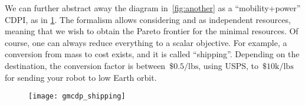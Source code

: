\begin{example}
    We can further abstract away the diagram in~\cref{fig:another} as a ``mobility+power'' CDPI, as in \cref{fig:shipping}.
    The formalism allows considering  and  as independent resources, meaning that we wish to obtain the Pareto frontier for the minimal resources.
    Of course, one can always reduce everything to a scalar objective.
    For example, a conversion from mass to cost exists, and it is called ``shipping''.
    Depending on the destination, the conversion factor is between~$\$0.5/\mbox{lbs}$, using USPS, to~$\$10\mbox{k}/\mbox{lbs}$ for sending your robot to low Earth orbit.

    \begin{figure}[h!]
        \centering{}
        \texttt{[image: gmcdp\_shipping]}
        \caption{}
        \label{fig:shipping}
    \end{figure}

\end{example}
